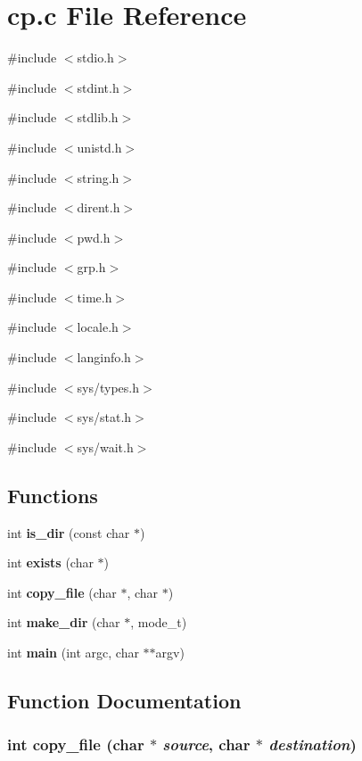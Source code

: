 \section{cp.c File Reference}
\label{cp_8c}
{\ttfamily \#include $<$stdio.h$>$}\par
{\ttfamily \#include $<$stdint.h$>$}\par
{\ttfamily \#include $<$stdlib.h$>$}\par
{\ttfamily \#include $<$unistd.h$>$}\par
{\ttfamily \#include $<$string.h$>$}\par
{\ttfamily \#include $<$dirent.h$>$}\par
{\ttfamily \#include $<$pwd.h$>$}\par
{\ttfamily \#include $<$grp.h$>$}\par
{\ttfamily \#include $<$time.h$>$}\par
{\ttfamily \#include $<$locale.h$>$}\par
{\ttfamily \#include $<$langinfo.h$>$}\par
{\ttfamily \#include $<$sys/types.h$>$}\par
{\ttfamily \#include $<$sys/stat.h$>$}\par
{\ttfamily \#include $<$sys/wait.h$>$}\par
\subsection*{Functions}
\begin{DoxyCompactItemize}
\item 
int {\bf is\_\-dir} (const char $\ast$)
\item 
int {\bf exists} (char $\ast$)
\item 
int {\bf copy\_\-file} (char $\ast$, char $\ast$)
\item 
int {\bf make\_\-dir} (char $\ast$, mode\_\-t)
\item 
int {\bf main} (int argc, char $\ast$$\ast$argv)
\end{DoxyCompactItemize}


\subsection{Function Documentation}
\subsubsection[{copy\_\-file}]{\setlength{\rightskip}{0pt plus 5cm}int copy\_\-file (char $\ast$ {\em source}, \/  char $\ast$ {\em destination})}\label{cp_8c_a5d39161534e225e63e2b654d3216e38c}



